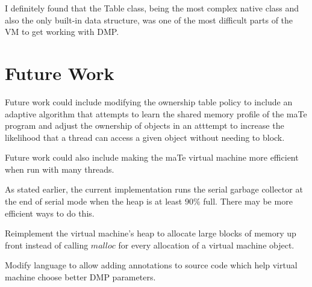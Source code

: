 
I definitely found that the Table class, being the most complex native
class and also the only built-in data structure, was one of the most
difficult parts of the VM to get working with DMP.

\section{Future Work}

Future work could include modifying the ownership table policy to
include an adaptive algorithm that attempts to learn the shared memory
profile of the maTe program and adjust the ownership of objects in an
atttempt to increase the likelihood that a thread can access a given
object without needing to block.

Future work could also include making the maTe virtual machine more
efficient when run with many threads.

As stated earlier, the current implementation runs the serial garbage
collector at the end of serial mode when the heap is at least $90\%$
full.  There may be more efficient ways to do this.

Reimplement the virtual machine's heap to allocate large blocks of
memory up front instead of calling $malloc$ for every allocation of a
virtual machine object.

Modify language to allow adding annotations to source code which help
virtual machine choose better DMP parameters.

